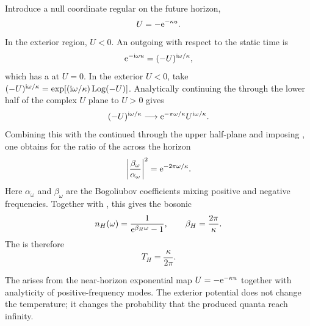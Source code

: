 Introduce a null coordinate regular on the future horizon,
\begin{equation}
U
=
-\mathrm{e}^{-\kappa u}.
\label{eq:kruskal-U}
\end{equation}
In the exterior region, $U<0$. An outgoing  with respect to the static time is
\begin{equation}
\mathrm{e}^{-\mathrm{i}\omega u}
=
(-U)^{\mathrm{i}\omega/\kappa},
\label{eq:rindler-mode-U}
\end{equation}
which has a  at $U=0$. In the exterior $U<0$, take
$(-U)^{\mathrm{i}\omega/\kappa}=\exp[(\mathrm{i}\omega/\kappa)\operatorname{Log}(-U)]$.
Analytically continuing the  through the lower half of the complex $U$ plane to $U>0$ gives
\begin{equation}
(-U)^{\mathrm{i}\omega/\kappa}
\longrightarrow
\mathrm{e}^{-\pi\omega/\kappa}
U^{\mathrm{i}\omega/\kappa}.
\label{eq:horizon-branch-continuation}
\end{equation}
Combining this with the  continued through the upper half-plane and imposing , one obtains for the ratio of the  across the horizon
\begin{equation}
\left|
\frac{\beta_\omega}{\alpha_\omega}
\right|^2
=
\mathrm{e}^{-2\pi\omega/\kappa}.
\label{eq:bogoliubov-thermal-ratio}
\end{equation}
Here $\alpha_\omega$ and $\beta_\omega$ are the Bogoliubov coefficients mixing positive and negative frequencies. Together with , this gives the bosonic 
\begin{equation}
n_H(\omega)
=
\frac{1}{\mathrm{e}^{\beta_H\omega}-1},
\qquad
\beta_H
=
\frac{2\pi}{\kappa}.
\label{eq:hawking-occupation}
\end{equation}
The  is therefore
\begin{equation}
T_H
=
\frac{\kappa}{2\pi}.
\label{eq:hawking-temperature}
\end{equation}
\cite{Hawking:1975vcx,BirrellDavies:1982}

\begin{principlebox}
The  arises from the near-horizon exponential map $U=-\mathrm{e}^{-\kappa u}$ together with analyticity of positive-frequency modes. The exterior potential does not change the temperature; it changes the probability that the produced quanta reach infinity.
\end{principlebox}

